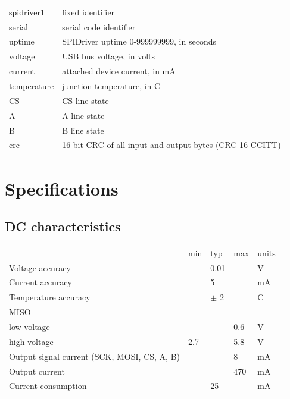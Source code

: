 \documentclass{article}
\newcommand{\heavyline}{\specialrule{1pt}{1pt}{1pt}}
\newcommand{\gap}{\vspace{10pt}}
\begin{document}
\gap\begin{tabular}{ll}
\hline
spidriver1      & fixed identifier \\
serial          & serial code identifier \\
uptime          & SPIDriver uptime 0-999999999, in seconds \\
voltage         & USB bus voltage, in volts \\
current         & attached device current, in mA \\
temperature     & junction temperature, in C \\
CS              & CS line state \\
A               & A line state \\
B               & B line state \\
crc             & 16-bit CRC of all input and output bytes (CRC-16-CCITT) \\
\hline
\end{tabular}\gap

\newpage
\hypertarget{technical-specifications}{}
\hypertarget{technical-specifications}{%
\section{Specifications}\label{electrical-characteristics}}

\subsection{DC characteristics}
\vspace{10 pt}
{\renewcommand{\arraystretch}{1.2}%

\begin{tabularx}{\linewidth}{XC{40pt}C{40pt}C{40pt}C{40pt}}
\heavyline
& min & typ & max & units \\ \heavyline

Voltage accuracy              && 0.01 && V            \\ \hline
Current accuracy              && 5 && mA              \\ \hline
Temperature accuracy          && $\pm$ 2 && C            \\ \hline
MISO & & & & \\
\hspace{10pt}low voltage & & & 0.6 & V \\
\hspace{10pt}high voltage & 2.7 &   & 5.8 & V \\ \hline
Output signal current (SCK, MOSI, CS, A, B)  &&& 8 & mA \\ \hline
Output current        & & & 470 & mA                  \\ \hline
Current consumption   & & 25 & & mA                   \\ \hline

\end{tabularx}}
\vspace{10 pt}
\end{document}
